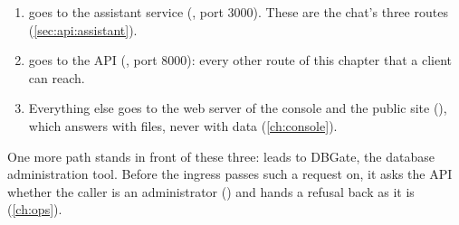 \begin{enumerate}
  \item {} goes to the assistant service (,
    port 3000). These are the chat's three routes (\cref{sec:api:assistant}).
  \item {} goes to the API (, port 8000): every other route
    of this chapter that a client can reach.
  \item Everything else goes to the web server of the console and the public site
    (), which answers with files, never with data (\cref{ch:console}).
\end{enumerate}

One more path stands in front of these three:  leads to DBGate, the database
administration tool. Before the ingress passes such a request on, it asks the API whether the
caller is an administrator () and hands a refusal back as
it is (\cref{ch:ops}).

